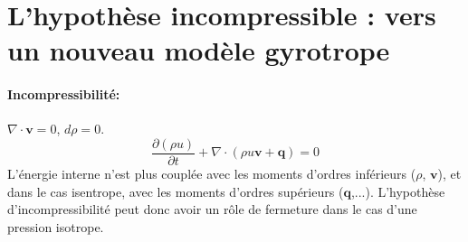 \section{L'hypothèse incompressible : vers un nouveau modèle gyrotrope}
\label{sec-112}

\paragraph{Incompressibilité:} $\nabla \cdot \mathbf{v} = 0$, $d \rho = 0$.
\begin{equation}
 \frac{\partial (\rho u)}{\partial t} +  \nabla \cdot (\rho u\mathbf{v} + \mathbf{q})  = 0
\end{equation}
L'énergie interne n'est plus couplée avec les moments d'ordres inférieurs ($\rho$, $\mathbf{v}$), et dans le cas isentrope, avec les moments d'ordres supérieurs ($\mathbf{q}$,...). L'hypothèse d'incompressibilité peut donc avoir un rôle de fermeture dans le cas d'une pression isotrope. 